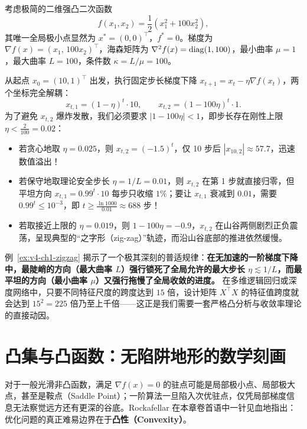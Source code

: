 \begin{example}[二维狭长山谷上的之字形停滞]\label{ex:v4-ch1-zigzag}
考虑极简的二维强凸二次函数
\[
  f(x_1, x_2) = \frac{1}{2}\left(x_1^2 + 100 x_2^2\right),
\]
其唯一全局极小点显然为 $x^* = (0,0)^\top$，$f^* = 0$。梯度为 $\nabla f(x) = (x_1,\, 100x_2)^\top$，海森矩阵为 $\nabla^2 f(x) = \operatorname{diag}(1, 100)$，最小曲率 $\mu = 1$，最大曲率 $L = 100$，条件数 $\kappa = L/\mu = 100$。

从起点 $x_0 = (10, 1)^\top$ 出发，执行固定步长梯度下降 $x_{t+1} = x_t - \eta \nabla f(x_t)$，两个坐标完全解耦：
\[
  x_{t,1} = (1 - \eta)^t \cdot 10, \qquad x_{t,2} = (1 - 100\eta)^t \cdot 1.
\]
为了避免 $x_{t,2}$ 爆炸发散，我们必须要求 $|1 - 100\eta| < 1$，即步长存在刚性上限 $\eta < \frac{2}{100} = 0.02$：
\begin{itemize}
  \item 若贪心地取 $\eta = 0.025$，则 $x_{t,2} = (-1.5)^t$，仅 10 步后 $|x_{10,2}| \approx 57.7$，迅速数值溢出！
  \item 若保守地取理论安全步长 $\eta = 1/L = 0.01$，则 $x_{t,2}$ 在第 1 步就直接归零，但平坦方向 $x_{t,1} = 0.99^t \cdot 10$ 每步只收缩 $1\%$；要让 $x_{t,1}$ 衰减到 $0.01$，需要 $0.99^t \le 10^{-3}$，即 $t \ge \frac{\ln 1000}{0.01} \approx 688$ 步！
  \item 若取接近上限的 $\eta = 0.019$，则 $1 - 100\eta = -0.9$，$x_{t,2}$ 在山谷两侧剧烈正负震荡，呈现典型的“之字形（zig-zag）”轨迹，而沿山谷底部的推进依然缓慢。
\end{itemize}
\end{example}

例~\ref{ex:v4-ch1-zigzag} 揭示了一个极其深刻的普适规律：\textbf{在无加速的一阶梯度下降中，最陡峭的方向（最大曲率 $L$）强行锁死了全局允许的最大步长 $\eta \lesssim 1/L$，而最平坦的方向（最小曲率 $\mu$）又强行拖慢了全局收敛的进度。} 在多维逻辑回归或深度网络中，只要不同特征尺度的跨度达到 $15$ 倍，设计矩阵 $X^\top X$ 的特征值跨度就会达到 $15^2 = 225$ 倍乃至上千倍——这正是我们需要一套严格凸分析与收敛率理论的直接动因。

\section{凸集与凸函数：无陷阱地形的数学刻画}

对于一般光滑非凸函数，满足 $\nabla f(x) = 0$ 的驻点可能是局部极小点、局部极大点，甚至是鞍点（Saddle Point）；一阶算法一旦陷入次优驻点，仅凭局部梯度信息无法察觉远方还有更深的谷底。Rockafellar 在本章卷首语中一针见血地指出：优化问题的真正难易边界在于\textbf{凸性（Convexity）}。

